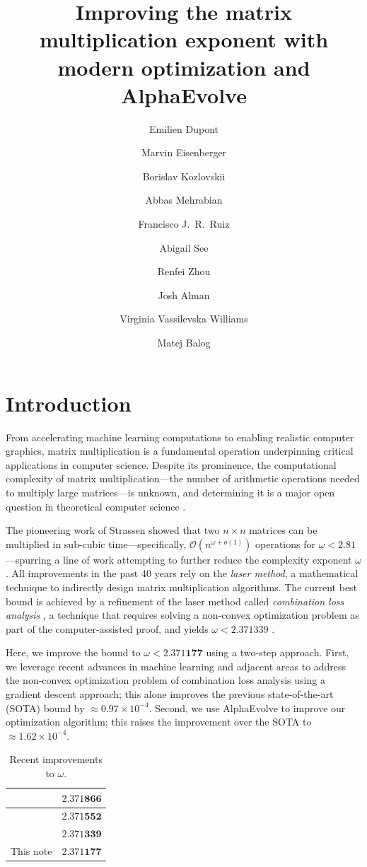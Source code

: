 \documentclass[11pt, a4paper, copyright, gdm]{google}
\title{Improving the matrix multiplication exponent with modern optimization and AlphaEvolve}
\author[*,1]{Emilien Dupont}
\author[*,1]{Marvin Eisenberger}
\author[*,1]{Borislav Kozlovskii}
\author[*,1]{Abbas Mehrabian}
\author[*,1]{Francisco J.\ R.\ Ruiz}
\author[*,1]{Abigail See}
\author[*,2]{Renfei Zhou}
\author[3]{Josh Alman}
\author[4]{Virginia Vassilevska Williams}
\author[1]{Matej Balog}
\affil[*]{Equal contribution in alphabetical order}
\affil[1]{\thepa{}{}}
\affil[2]{Carnegie Mellon University}
\affil[3]{Columbia University}
\affil[4]{MIT}
\newcommand{\method}{{AlphaEvolve}\xspace}
\theoremstyle{definition}
\theoremstyle{remark}
\theoremstyle{plain}
\begin{document}
\maketitle

\section{Introduction}

From accelerating machine learning computations to enabling realistic computer graphics, matrix multiplication is a fundamental operation underpinning critical applications in computer science. Despite its prominence, the computational complexity of matrix multiplication---the number of arithmetic operations needed to multiply large matrices---is unknown, and determining it is a major open question in theoretical computer science \citep{blaser2013fast}.

The pioneering work of Strassen \citep{strassen1969gaussian} showed that two $n\times n$ matrices can be multiplied in sub-cubic time---specifically, $\mathcal{O}(n^{\omega + o(1)})$ operations for $\omega < 2.81$---spurring a line of work attempting to further reduce the complexity exponent $\omega$ \citep{pan1978strassen,bini1979order,schonhage1981partial,romani1982some,coppersmith1981asymptotic,strassen1986asymptotic,coppersmith1990matrix,stothers2010complexity,williams2012multiplying,legall2014algebraic,alman2024refined,duan2022faster,williams2024new,alman2025more}. All improvements in the past 40 years rely on the \emph{laser method}, a mathematical technique to indirectly design matrix multiplication algorithms. The current best bound is achieved by a refinement of the laser method called \emph{combination loss analysis} \citep{duan2022faster}, a technique that requires solving a non-convex optimization problem as part of the computer-assisted proof, and yields $\omega < 2.371339$ \citep{alman2025more}.

Here, we improve the bound to $\omega < 2.371\mathbf{177}$ using a two-step approach. First, we leverage recent advances in machine learning and adjacent areas to address the non-convex optimization problem of combination loss analysis using a gradient descent approach; this alone improves the previous state-of-the-art (SOTA) bound by $\approx 0.97 \times 10^{-4}$. Second, we use \method \citep{novikov2025alphaevolve} to improve our optimization algorithm; this raises the improvement over the SOTA to $\approx 1.62 \times 10^{-4}$.

\begin{table}[b]
\centering
\begin{tabular}{l|l}
\cite{duan2022faster} & $2.371\mathbf{866}$   \\ \hline
\cite{williams2024new} & $2.371\mathbf{552}$  \\ \hline
\cite{alman2025more} & $2.371\mathbf{339}$  \\ \hline
This note & $2.371\mathbf{177}$ \\
\end{tabular}
\caption{Recent improvements to $\omega$.}
\end{table}
\end{document}
